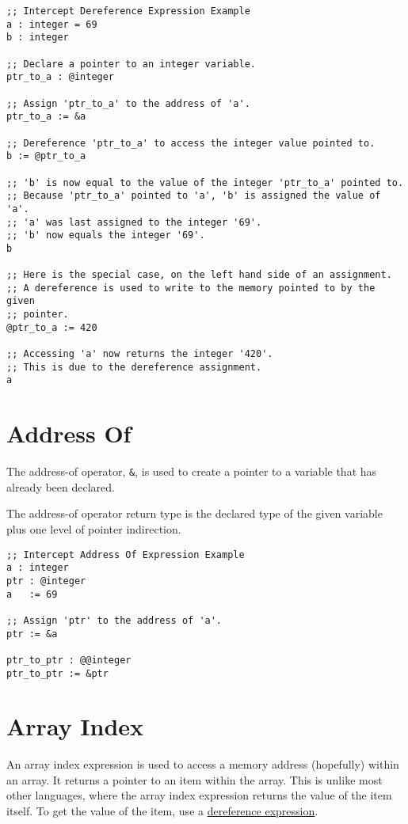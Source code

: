 \documentclass[12pt]{report}
\begin{document}
\begin{Verbatim}[samepage=true]
;; Intercept Dereference Expression Example
a : integer = 69
b : integer

;; Declare a pointer to an integer variable.
ptr_to_a : @integer

;; Assign 'ptr_to_a' to the address of 'a'.
ptr_to_a := &a

;; Dereference 'ptr_to_a' to access the integer value pointed to.
b := @ptr_to_a

;; 'b' is now equal to the value of the integer 'ptr_to_a' pointed to.
;; Because 'ptr_to_a' pointed to 'a', 'b' is assigned the value of 'a'.
;; 'a' was last assigned to the integer '69'.
;; 'b' now equals the integer '69'.
b

;; Here is the special case, on the left hand side of an assignment.
;; A dereference is used to write to the memory pointed to by the given
;; pointer.
@ptr_to_a := 420

;; Accessing 'a' now returns the integer '420'.
;; This is due to the dereference assignment.
a
\end{Verbatim}

\section{Address Of}
\label{subsec:expressions-address-of}

The address-of operator, \verb|&|, is used to create a pointer to a variable that has already been declared.

The address-of operator return type is the declared type of the given variable plus one level of pointer indirection.

\begin{Verbatim}[samepage=true]
;; Intercept Address Of Expression Example
a : integer
ptr : @integer
a   := 69

;; Assign 'ptr' to the address of 'a'.
ptr := &a

ptr_to_ptr : @@integer
ptr_to_ptr := &ptr
\end{Verbatim}

\section{Array Index}
\label{subsec:expressions-array-index}

An array index expression is used to access a memory address (hopefully) within an array. It returns a pointer to an item within the array. This is unlike most other languages, where the array index expression returns the value of the item itself. To get the value of the item, use a \hyperref[subsec:expressions-dereference]{dereference expression}.
\end{document}
